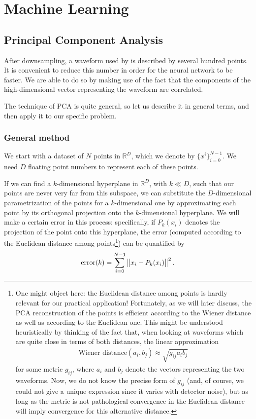 \documentclass[main.tex]{subfiles}
\begin{document}
\section{Machine Learning}

\subsection{Principal Component Analysis} \label{sec:principal-component-analysis}

After downsampling, a waveform used by \mb is described by several hundred points.
It is convenient to reduce this number in order for the neural network to be faster.
We are able to do so by making use of the fact that the components of the high-dimensional vector representing the waveform are correlated. 

The technique of \ac{PCA} is quite general, so let us describe it in general terms, and then apply it to our specific problem.

\subsubsection{General method}

We start with a dataset of \(N\) points in \(\mathbb{R}^{D}\), which we denote by \(\{ x^{i}\}_{i=0}^{N-1}\).
We need \(D\) floating point numbers to represent each of these points.

If we can find a \(k\)-dimensional hyperplane in \(\mathbb{R}^{D}\), with \(k \ll D\), such that our points are never very far from this subspace, we can substitute the \(D\)-dimensional parametrization of the points for a \(k\)-dimensional one by approximating each point by its orthogonal projection onto the \(k\)-dimensional hyperplane. 
We will make a certain error in this process: specifically, if \(P_k(x_{i})\) denotes the projection of the point onto this hyperplane, the error (computed according to the Euclidean distance among points\footnote{One might object here: the Euclidean distance among points is hardly relevant for our practical application! Fortunately, as we will later discuss, the PCA reconstruction of the points is efficient according to the Wiener distance as well as according to the Euclidean one. This might be understood heuristically by thinking of the fact that, when looking at waveforms which are quite close in terms of both distances, the linear approximation 
%
\begin{align}
\text{Wiener distance}(a_i, b_j) \approx \sqrt{g_{ij} a_{i} b_j }
\,
\end{align}
%
for some metric \(g_{ij}\), where \(a_i\) and \(b_j\) denote the vectors representing the two waveforms. Now, we do not know the precise form of \(g_{ij}\) (and, of course, we could not give a unique expression since it varies with detector noise), but as long as the metric is not pathological convergence in the Euclidean distance will imply convergence for this alternative distance. 
}) can be quantified by
%
\begin{align}
\text{error} (k) = \sum _{i=0}^{N-1} \norm{x_i - P_k(x_i)}^2
\,.
\end{align}
\end{document}
